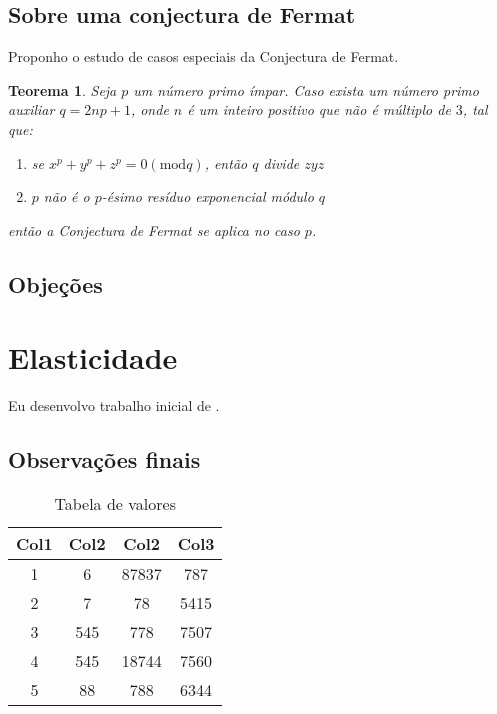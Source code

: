 \documentclass[12pt,tcc,abnt,latin,english,brazil]{df-ufpb}
\newtheorem{theorem}{Teorema}[section]
\begin{document}
\lipsum[1-2]

\section{Sobre uma conjectura de Fermat}
Proponho o estudo de casos especiais da Conjectura de Fermat.

\begin{theorem}
  Seja $p$ um número primo ímpar. Caso exista um número primo auxiliar $q = 2np +1$, onde $n$ é um inteiro positivo que não é múltiplo de $3$, tal que:
  \begin{enumerate}
  \item se $x^{p} + y^{p} + z^{p} = 0 (\text{mod} q)$, então $q$ divide $zyz$
  \item $p$ não é o $p$-ésimo resíduo exponencial módulo $q$
  \end{enumerate}
  então a Conjectura de Fermat se aplica no caso $p$.
\end{theorem}

\lipsum[5-6]
\begin{quote}
  \lipsum[8-9]
  \autocite{ciceroFBM}
\end{quote}

\lipsum[1]

\section{Objeções}

\lipsum[7-9]

\chapter{Elasticidade}

Eu desenvolvo trabalho inicial de \textcite{lagrangeO}.
\section{Observações finais}
\lipsum[1-7]

\begin{table}
  \centering
  \begin{tabular}{||c c c c||} 
    \hline
    Col1 & Col2 & Col2 & Col3 \\ [0.5ex] 
    \hline\hline
    1 & 6 & 87837 & 787 \\ 
    \hline
    2 & 7 & 78 & 5415 \\
    \hline
    3 & 545 & 778 & 7507 \\
    \hline
    4 & 545 & 18744 & 7560 \\
    \hline
    5 & 88 & 788 & 6344 \\ [1ex] 
    \hline
  \end{tabular}

  \caption{Tabela de valores}
\end{table}

\lipsum[1-3]

\printbibliography[heading=bibintoc,title=\bibname]{}
\end{document}
